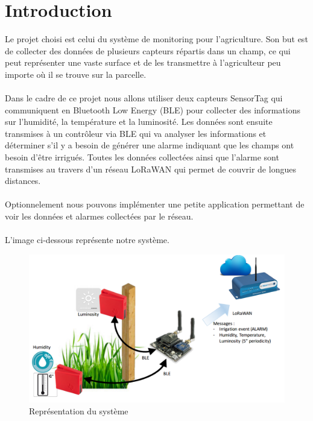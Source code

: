 \newpage
\section{Introduction}
Le projet choisi est celui du système de monitoring pour l'agriculture. Son but est de collecter des données de plusieurs capteurs répartis dans un champ, ce qui peut représenter une vaste surface et de les transmettre à l'agriculteur peu importe où il se trouve sur la parcelle.\\\\
Dans le cadre de ce projet nous allons utiliser deux capteurs SensorTag qui communiquent en Bluetooth Low Energy (BLE) pour collecter des informations sur l'humidité, la température et la luminosité. Les données sont ensuite transmises à un contrôleur via BLE qui va analyser les informations et déterminer s'il y a besoin de générer une alarme indiquant que les champs ont besoin d'être irrigués. Toutes les données collectées ainsi que l'alarme sont transmises au travers d'un réseau LoRaWAN qui permet de couvrir de longues distances.\\\\
Optionnelement nous pouvons implémenter une petite application permettant de voir les données et alarmes collectées par le réseau.\\\\
L'image ci-dessous représente notre système.
\begin{figure}[H]
	\begin{center}
		\includegraphics[width=17cm]{img/intro.png}
		\caption{Représentation du système}
		\label{intro}
	\end{center}
\end{figure}